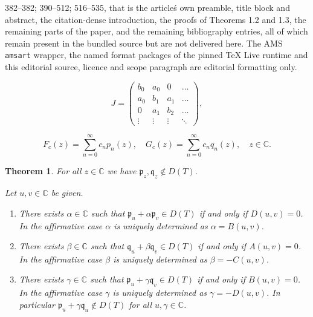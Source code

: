 \documentclass[10pt,a4paper]{amsart}
\newtheorem{thm}{Theorem}[section]
\newcommand{\C}{\mathbb{C}}
\begin{document}
382--382; 390--512; 516--535, that is the article\'s own preamble, title block and abstract, the citation-dense introduction, the proofs of Theorems 1.2 and 1.3, the remaining parts of the paper, and the remaining bibliography entries, all of which remain present in the bundled source but are not delivered here. The AMS \texttt{amsart} wrapper, the named format packages of the pinned TeX Live runtime and this editorial source, licence and scope paragraph are editorial formatting only.\par\smallskip
\setcounter{section}{1}
\setcounter{equation}{1}
\setcounter{thm}{0}
\begin{equation}\label{eq:Jac}
J=\begin{pmatrix}
b_0 & a_0 & 0 & \hdots\\
a_0 & b_1 & a_1 & \hdots\\
0 & a_1 & b_2 & \hdots\\
\vdots &\vdots & \vdots & \ddots
\end{pmatrix},
\end{equation}

\setcounter{section}{1}
\setcounter{equation}{4}
\setcounter{thm}{1}
\begin{equation}\label{eq:FGc}
F_c(z)=\sum_{n=0}^\infty c_np_n(z),\quad G_c(z)=\sum_{n=0}^\infty c_nq_n(z),\quad z\in\C.
\end{equation}

\setcounter{section}{1}
\setcounter{equation}{14}
\setcounter{thm}{1}
\begin{thm}\label{thm:pqmain} For all $z\in\C$ we have $\mathfrak{p}_z, \mathfrak{q}_z\notin D(T)$.

Let $u,v\in\C$ be given.
\begin{enumerate}
\item[(i)] There exists $\alpha\in\C$ such that $\mathfrak{p}_u+\alpha \mathfrak{p}_v\in D(T)$ if and only if $D(u,v)=0$. In the affirmative case $\alpha$  is uniquely determined as
$\alpha=B(u,v)$. 

\item[(ii)] There exists $\beta\in\C$ such that $\mathfrak{q}_u+\beta \mathfrak{q}_v\in D(T)$ if and only if $A(u,v)=0$. In the affirmative case $\beta$  is uniquely determined as $\beta=-C(u,v)$.

\item[(iii)] There exists $\gamma\in\C$ such that $\mathfrak{p}_u+\gamma \mathfrak{q}_v\in D(T)$ if and only if $B(u,v)=0$. In the affirmative case $\gamma$  is uniquely determined as $\gamma=-D(u,v)$. In particular $\mathfrak{p}_u+\gamma\mathfrak{q}_u\notin D(T)$ for all $u, \gamma\in\C$.
\end{enumerate}
\end{thm}
\end{document}
